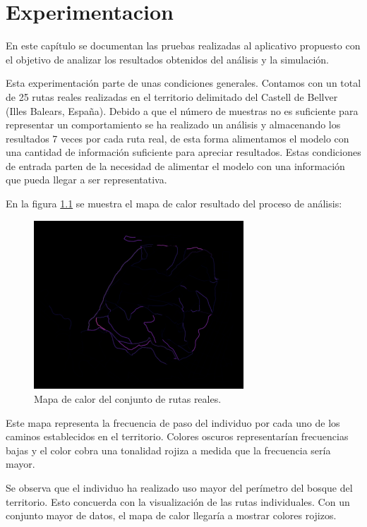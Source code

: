\chapter{Experimentacion}
En este capítulo se documentan las pruebas realizadas al aplicativo propuesto con el objetivo de analizar 
los resultados obtenidos del análisis y la simulación.

Esta experimentación parte de unas condiciones generales. Contamos con un total de 25 rutas reales 
realizadas en el territorio delimitado del Castell de Bellver (Illes Balears, España). Debido a que el 
número de muestras no es suficiente para representar un comportamiento se ha realizado un análisis y 
almacenando los resultados 7 veces por cada ruta real, de esta forma alimentamos el modelo con una 
cantidad de información suficiente para apreciar resultados. Estas condiciones de entrada parten de la
necesidad de alimentar el modelo con una información que pueda llegar a ser representativa.

En la figura \ref{figure:RealHeatMap} se muestra el mapa de calor resultado del proceso de análisis:
\begin{figure}[!htb]
\begin{center}
\includegraphics[width=0.7\textwidth]{./Imagenes/HeatMap.png}
\caption{Mapa de calor del conjunto de rutas reales.}
\label{figure:RealHeatMap}
\end{center}
\end{figure}
\newpage
Este mapa representa la frecuencia de paso del individuo por cada uno de los caminos establecidos en 
el territorio. Colores oscuros representarían frecuencias bajas y el color cobra una tonalidad rojiza a 
medida que la frecuencia sería mayor.

Se observa que el individuo ha realizado uso mayor del perímetro del bosque del territorio. Esto 
concuerda con la visualización de las rutas individuales. Con un conjunto mayor de datos, el mapa de 
calor llegaría a mostrar colores rojizos.

